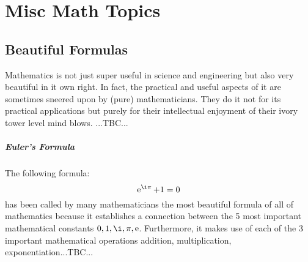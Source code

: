 \chapter{Misc Math Topics}

\section{Beautiful Formulas}
Mathematics is not just super useful in science and engineering but also very beautiful in it own right. In fact, the practical and useful aspects of it are sometimes sneered upon by (pure) mathematicians. They do it not for its practical applications but purely for their intellectual enjoyment of their ivory tower level mind blows. ...TBC...


\paragraph{Euler's Formula}
The following formula:
\begin{equation}
\e^{\i \pi} + 1 = 0
\end{equation}
has been called by many mathematicians the most beautiful formula of all of mathematics because it establishes a connection between the 5 most important mathematical constants $0,1,\i,\pi,\e$. Furthermore, it makes use of each of the 3 important mathematical operations addition, multiplication, exponentiation...TBC...



